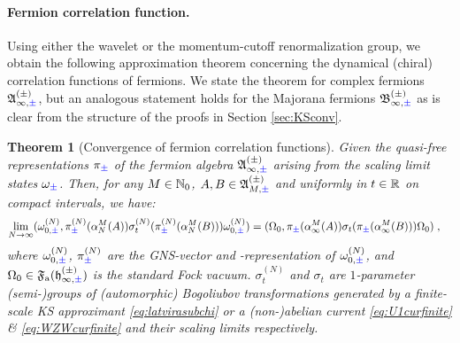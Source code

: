\documentclass[a4paper, 11pt]{article}
\newcommand{\fA}{\mathfrak{A}}\newcommand{\cA}{\mathcal{A}}\newcommand{\dA}{\mathds{A}}\newcommand{\sA}{\mathscr{A}}
\newcommand{\ua}{\textup a}
\newcommand{\fB}{\mathfrak{B}}\newcommand{\cB}{\mathcal{B}}\newcommand{\dB}{\mathds{B}}\newcommand{\sB}{\mathscr{B}}
\newcommand{\fF}{\mathfrak{F}}\newcommand{\cF}{\mathcal{F}}\newcommand{\dF}{\mathds{F}}\newcommand{\sF}{\mathscr{F}}
\newcommand{\fh}{\mathfrak{h}}
\DeclareMathOperator{\1}{\mathds{1}}
\newtheorem{thm}{Theorem} [section]
\begin{document}
\paragraph{Fermion correlation function.}
Using either the wavelet or the momentum-cutoff renormalization group, we obtain the following approximation theorem concerning the dynamical (chiral) correlation functions of fermions. We state the theorem for complex fermions $\fA^{(\pm)}_{\infty,{\color{blue}\pm}}$, but an analogous statement holds for the Majorana fermions $\fB^{(\pm)}_{\infty,{\color{blue}\pm}}$ as is clear from the structure of the proofs in Section \ref{sec:KSconv}.
\begin{thm}[Convergence of fermion correlation functions]
\label{thm:corapprox}
Given the quasi-free representations $\pi_{{\color{blue}\pm}}$ of the fermion algebra $\fA^{(\pm)}_{\infty,{\color{blue}\pm}}$ arising from the scaling limit states $\omega_{{\color{blue}\pm}}$. Then, for any $M\in\mathbb{N}_{0}$, $A,B\in\fA^{(\pm)}_{M,{\color{blue}\pm}}$ and uniformly in $t\in\mathbb{R}$ on compact intervals, we have:
\begin{align*}
\lim_{N\rightarrow\infty}(\omega^{(N)}_{0,{\color{blue}\pm}},\pi^{(N)}_{{\color{blue}\pm}}(\alpha^{M}_{N}(A))\sigma^{(N)}_{t}(\pi^{(N)}_{{\color{blue}\pm}}(\alpha^{M}_{N}(B)))\omega^{(N)}_{0,{\color{blue}\pm}}) & = (\Omega_{0},\pi_{{\color{blue}\pm}}(\alpha^{M}_{\infty}(A))\sigma_{t}(\pi_{{\color{blue}\pm}}(\alpha^{M}_{\infty}(B)))\Omega_{0})\;,
\end{align*}
where $\omega^{(N)}_{0,{\color{blue}\pm}}$, $\pi^{(N)}_{{\color{blue}\pm}}$ are the GNS-vector and -representation of $\omega^{(N)}_{0,{\color{blue}\pm}}$, and $\Omega_{0}\in\fF_{\ua}(\fh^{(\pm)}_{\infty,{\color{blue}\pm}})$ is the standard Fock vacuum. $\sigma^{(N)}_{t}$ and $\sigma_{t}$ are $1$-parameter (semi-)groups of (automorphic) Bogoliubov transformations generated by a finite-scale KS approximant \eqref{eq:latvirasubchi} or a (non-)abelian current \eqref{eq:U1curfinite} \& \eqref{eq:WZWcurfinite} and their scaling limits respectively.
\end{thm}
\end{document}
